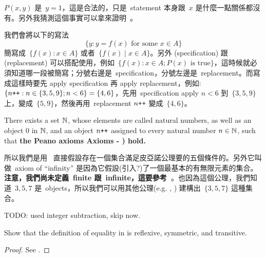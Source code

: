 \begin{note}
\(P(x, y)\) 是\ \(y = 1\)，這是合法的，只是\ statement 本身跟\ \(x\) 是什麼一點關係都沒有。另外我猜測這個事實可以拿來證明\ 。
\end{note}

\begin{note}
我們會將以下的寫法
\[
    \{y : y = f(x) \text{\ for some \(x \in A\)}\}
\]
簡寫成\ \( \{f(x): x \in A \} \) 或者\ \( \{f(x) \mid x \in A \} \)。另外  (specification) 跟  (replacement) 可以搭配使用，例如\ \(\{f(x) : x \in A; P(x) \text{\ is true}\} \)，這時候就必須知道哪一段被簡寫；分號右邊是\ specification，分號左邊是\ replacement。而寫成這樣時要先 apply specification 再 apply replacement，例如: \( \{n\texttt{++} : n \in \{3, 5, 9\}; n < 6 \} = \{4, 6\} \)，先用\ specification apply \(n < 6\) 到\ \(\{3, 5, 9\}\) 上，變成\  \(\{5, 9\}\)，然後再用\ replacement \(n\texttt{++}\) 變成\ \(\{4, 6\}\)。
\end{note}

\begin{axiom} [Infinity] \label{axm 3.7}
There exists a set \(\mathbb{N}\), whose elements are called natural numbers, as well as an object \(0\) in \(\mathbb{N}\), and an object \(n\texttt{++}\) assigned to every natural number \(n \in \mathbb{N}\), such that \textbf{the Peano axioms Axioms  - ) hold.}
\end{axiom}

\begin{note}
所以我們是用\  直接假設存在一個集合滿足皮亞諾公理要的五個條件的。另外它叫做\ axiom of ``infinity'' 是因為它假設(引入?)了一個最基本的有無限元素的集合。\textbf{注意，我們尚未定義\ finite 跟\ infinite，這要參考\  }。也因為這個公理，我們知道\ \(3, 5, 7\) 是\ objects，所以我們可以用其他公理(e.g. , ) 建構出\ \( \{ 3, 5, 7 \}\) 這種集合。
\end{note}

\begin{example} \label{example 3.1.33}
TODO: used integer subtraction, skip now.
\end{example}

\exercisesection

\begin{exercise}\label{exercise 3.1.1}
Show that the definition of equality in  is reflexive, symmetric, and transitive.
\end{exercise}

\begin{proof}
See .
\end{proof}

